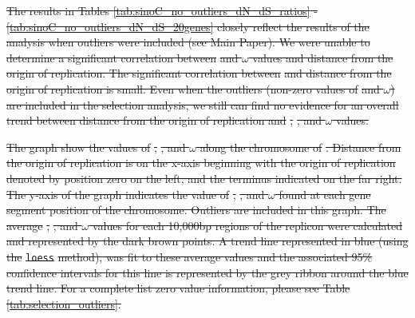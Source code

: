 \documentclass[11pt]{article}
\newcommand{\smel}{\textit{S.\,meliloti}\xspace}
\newcommand{\dn}{\textit{dN}\xspace}
\newcommand{\ds}{\textit{dS}\xspace}
\providecommand{\DIFdeltex}[1]{{\protect\color{red}\sout{#1}}}                      %
\providecommand{\DIFdelFL}[1]{\DIFdel{#1}} %
\providecommand{\DIFdel}[1]{\texorpdfstring{\DIFdeltex{#1}}{}} %
\begin{document}
\begin{table}[h]
\DIFdelFL{The results in Tables \ref{tab:sinoC_no_outliers_dN_dS_ratios} - \ref{tab:sinoC_no_outliers_dN_dS_20genes} closely reflect the results of the }%
\DIFdelFL{analysis when outliers were included (see Main Paper).
We were unable to determine a significant correlation between }%
\DIFdelFL{and $\omega$ values and distance from the origin of replication.
The significant correlation between }%
\DIFdelFL{and distance from the origin of replication is small.
Even when the outliers (non-zero values of }%
\DIFdelFL{and $\omega$) are included in the selection analysis, we still can find no evidence for an overall trend between distance from the origin of replication and }%
\DIFdelFL{, }%
\DIFdelFL{, and $\omega$ values.
}%

{%
\DIFdelFL{The graph show the values of }%
\DIFdelFL{, }%
\DIFdelFL{, and $\omega$ along the chromosome of }%
\DIFdelFL{. Distance from the origin of replication is on the x-axis beginning with the origin of replication denoted by position zero on the left, and the terminus indicated on the far right. The y-axis of the graph indicates the value of }%
\DIFdelFL{, }%
\DIFdelFL{, and $\omega$ found at each gene segment position of the chromosome. Outliers are included in this graph. The average }%
\DIFdelFL{, }%
\DIFdelFL{, and $\omega$ values for each 10,000bp regions of the replicon were calculated and represented by the dark brown points. A trend line represented in blue (using the }\texttt{\DIFdelFL{loess}} %
\DIFdelFL{method), was fit to these average values and the associated 95\% confidence intervals for this line is represented by the grey ribbon around the blue trend line. For a complete list zero value information, please see Table \ref{tab:selection_outliers}.}}



\end{table}
\end{document}
